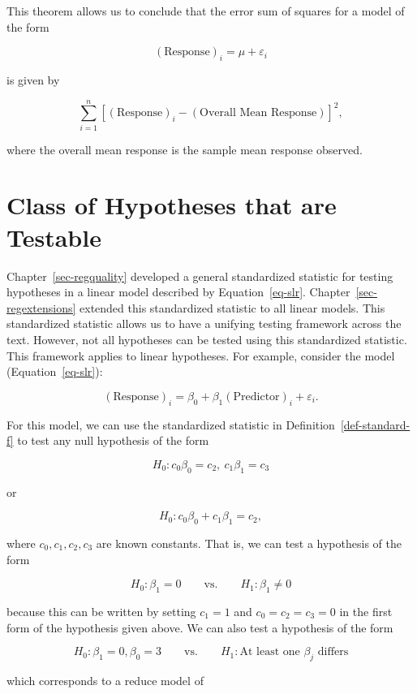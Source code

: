 \documentclass[
  letterpaper,
  DIV=11,
  numbers=noendperiod]{scrreprt}
\theoremstyle{definition}
\theoremstyle{definition}
\theoremstyle{plain}
\theoremstyle{remark}
\begin{document}
This theorem allows us to conclude that the error sum of squares for a
model of the form

\[(\text{Response})_i = \mu + \varepsilon_i\]

is given by

\[\sum_{i=1}^{n} \left[(\text{Response})_i - (\text{Overall Mean Response})\right]^2,\]

where the overall mean response is the sample mean response observed.

\hypertarget{class-of-hypotheses-that-are-testable}{%
\section{Class of Hypotheses that are
Testable}\label{class-of-hypotheses-that-are-testable}}

Chapter~\ref{sec-regquality} developed a general standardized statistic
for testing hypotheses in a linear model described by
Equation~\ref{eq-slr}. Chapter~\ref{sec-regextensions} extended this
standardized statistic to all linear models. This standardized statistic
allows us to have a unifying testing framework across the text. However,
not all hypotheses can be tested using this standardized statistic. This
framework applies to linear hypotheses. For example, consider the model
(Equation~\ref{eq-slr}):

\[(\text{Response})_i = \beta_0 + \beta_1 (\text{Predictor})_i + \varepsilon_i.\]

For this model, we can use the standardized statistic in
Definition~\ref{def-standard-f} to test any null hypothesis of the form

\[H_0: c_0\beta_0 = c_2, \ c_1\beta_1 = c_3\]

or

\[H_0: c_0\beta_0 + c_1\beta_1 = c_2,\]

where \(c_0, c_1, c_2, c_3\) are known constants. That is, we can test a
hypothesis of the form

\[H_0: \beta_1 = 0 \qquad \text{vs.} \qquad H_1: \beta_1 \neq 0\]

because this can be written by setting \(c_1 = 1\) and
\(c_0 = c_2 = c_3 = 0\) in the first form of the hypothesis given above.
We can also test a hypothesis of the form

\[H_0: \beta_1 = 0, \beta_0 = 3 \qquad \text{vs.} \qquad H_1: \text{At least one } \beta_j \text{ differs}\]

which corresponds to a reduce model of
\end{document}
